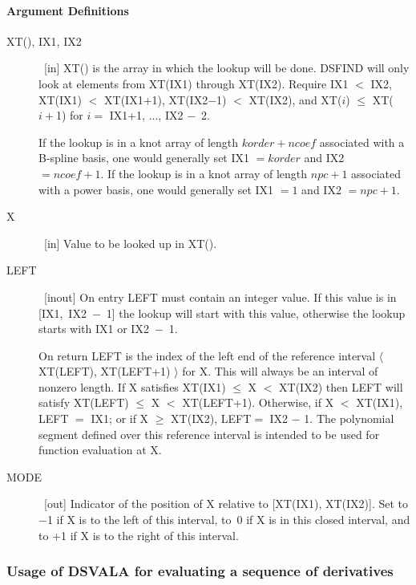 \documentclass[twoside]{MATH77}
\begin{document}
\paragraph{Argument Definitions}
\begin{description}
\item[XT(), IX1, IX2]  \ [in] XT() is the array in which the lookup will be
done. DSFIND will only look at elements from XT(IX1) through XT(IX2).
Require IX1 $<$ IX2, XT(IX1) $<$ XT(IX1+1), XT(IX2$-$1) $<$ XT(IX2), and
XT($i$) $\leq $ XT($i+$1) for $i=$ IX1+1, ..., IX2 $-$~2.

If the lookup is in a knot array of length $korder + ncoef$ associated with a
B-spline basis, one would generally set IX1 $=korder$ and IX2 $=ncoef+1.$ If
the lookup is in a knot array of length $npc+1$ associated with a power
basis, one would generally set IX1 $=1$ and IX2 $=npc+1.$

\item[X]  \ [in] Value to be looked up in XT().

\item[LEFT]  \ [inout] On entry LEFT must contain an integer value. If this
value is in [IX1,~IX2~$-$~1] the lookup will start with this value,
otherwise the lookup starts with IX1 or IX2~$-$~1.

On return LEFT is the index of the left end of the reference interval $%
\langle $ XT(LEFT), XT(LEFT+1) $\rangle $ for X. This will always be an
interval of nonzero length. If X satisfies XT(IX1) $\leq $ X $<$ XT(IX2) then
LEFT will satisfy XT(LEFT) $\leq $ X $<$ XT(LEFT+1). Otherwise, if X $<$
XT(IX1), LEFT $=$ IX1; or if X $\geq $ XT(IX2), LEFT$=$ IX2 $-$ 1. The
polynomial segment defined over this reference interval is intended to be
used for function evaluation at X.

\item[MODE]  \ [out] Indicator of the position of X relative to [XT(IX1),
XT(IX2)]. Set to $-$1 if X is to the left of this interval, to~0 if X is in
this closed interval, and to +1 if X is to the right of this interval.
\end{description}
\subsubsection{Usage of DSVALA for evaluating a sequence of derivatives}
\end{document}
